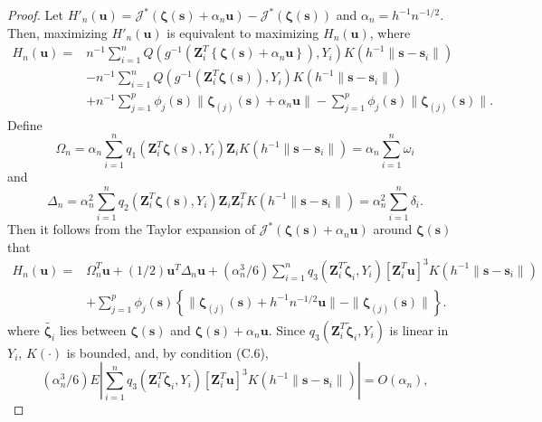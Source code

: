 \documentclass[authoryear,review, 12pt]{elsarticle}
\begin{document}
\begin{proof}
Let $H'_{n}(\bm{u})=\mathcal{J}^{*}\left(\bm{\zeta}(\bm{s})+\alpha_{n}\bm{u}\right)-\mathcal{J}^{*}\left(\bm{\zeta}(\bm{s})\right)$
and $\alpha_{n}=h^{-1}n^{-1/2}$. Then, maximizing $H'_{n}(\bm{u})$
is equivalent to maximizing $H_{n}(\bm{u})$, where 
\begin{align*}
H_{n}(\bm{u})= & n^{-1}\sum_{i=1}^{n}Q\left(g^{-1}\left(\bm{Z}_{i}^{T}\left\{ \bm{\zeta}(\bm{s})+\alpha_{n}\bm{u}\right\} \right),Y_{i}\right)K\left(h^{-1}\|\bm{s}-\bm{s}_{i}\|\right)\\
 & -n^{-1}\sum_{i=1}^{n}Q\left(g^{-1}\left(\bm{Z}_{i}^{T}\bm{\zeta}(\bm{s})\right),Y_{i}\right)K\left(h^{-1}\|\bm{s}-\bm{s}_{i}\|\right)\\
 & +n^{-1}\sum_{j=1}^{p}\phi_{j}\left(\bm{s}\right)\|\bm{\zeta}_{(j)}(\bm{s})+\alpha_{n}\bm{u}\|-\sum_{j=1}^{p}\phi_{j}\left(\bm{s}\right)\|\bm{\zeta}_{(j)}(\bm{s})\|.
\end{align*}
Define
\[
\Omega_{n}=\alpha_{n}\sum_{i=1}^{n}q_{1}\left(\bm{Z}_{i}^{T}\bm{\zeta}(\bm{s}),Y_{i}\right)\bm{Z}_{i}K\left(h^{-1}\|\bm{s}-\bm{s}_{i}\|\right)=\alpha_{n}\sum_{i=1}^{n}\omega_{i}
\]
and 
\[
\Delta_{n}=\alpha_{n}^{2}\sum_{i=1}^{n}q_{2}\left(\bm{Z}_{i}^{T}\bm{\zeta}(\bm{s}),Y_{i}\right)\bm{Z}_{i}\bm{Z}_{i}^{T}K\left(h^{-1}\|\bm{s}-\bm{s}_{i}\|\right)=\alpha_{n}^{2}\sum_{i=1}^{n}\delta_{i}.
\]
Then it follows from the Taylor expansion of $\mathcal{J}^{*}\left(\bm{\zeta}(\bm{s})+\alpha_{n}\bm{u}\right)$
around $\bm{\zeta}(\bm{s})$ that
\begin{align}
H_{n}\left(\bm{u}\right)= & \Omega_{n}^{T}\bm{u}+(1/2)\bm{u}^{T}\Delta_{n}\bm{u}+\left(\alpha_{n}^{3}/6\right)\sum_{i=1}^{n}q_{3}\left(\bm{Z}_{i}^{T}\tilde{\bm{\zeta}}_{i},Y_{i}\right)\left[\bm{Z}_{i}^{T}\bm{u}\right]^{3}K\left(h^{-1}\|\bm{s}-\bm{s}_{i}\|\right)\nonumber \\
 & +\sum_{j=1}^{p}\phi_{j}\left(\bm{s}\right)\left\{ \|\bm{\zeta}_{(j)}(\bm{s})+h^{-1}n^{-1/2}\bm{u}\|-\|\bm{\zeta}_{(j)}(\bm{s})\|\right\} .\label{eq:taylor-expanded-glm-criterion}
\end{align}
where $\tilde{\bm{\zeta}_{i}}$ lies between $\bm{\zeta}(\bm{s})$
and $\bm{\zeta}(\bm{s})+\alpha_{n}\bm{u}$. Since $q_{3}\left(\bm{Z}_{i}^{T}\tilde{\bm{\zeta}}_{i},Y_{i}\right)$
is linear in $Y_{i}$, $K\left(\cdot\right)$ is bounded, and, by
condition (C.6),
\[
\left(\alpha_{n}^{3}/6\right)E\left|\sum_{i=1}^{n}q_{3}\left(\bm{Z}_{i}^{T}\tilde{\bm{\zeta}}_{i},Y_{i}\right)\left[\bm{Z}_{i}^{T}\bm{u}\right]^{3}K\left(h^{-1}\|\bm{s}-\bm{s}_{i}\|\right)\right|=O\left(\alpha_{n}\right),
\]
\end{proof}
\end{document}
